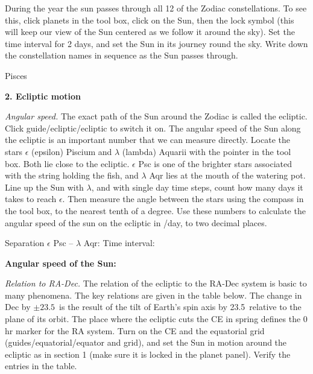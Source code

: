 \documentclass[12pt]{article}
\begin{document}
During the year the sun passes through all 12 of the Zodiac
constellations. To see this, click planets in the tool box, click
on the Sun, then the lock symbol (this will keep our view of the Sun
centered as we follow it around the sky). Set the time interval for 2
days, and set the Sun in its journey round the sky. Write down the
constellation names in sequence as the Sun passes through.

\medskip
Pisces \hrulefill


 \hrulefill

\bigskip
\noindent
{\bf 2. Ecliptic motion}

\medskip
\noindent
\emph{Angular speed.} The exact path of the Sun around the Zodiac is called the ecliptic. Click
guide/ecliptic/ecliptic to switch it on. The angular speed of the Sun
along the ecliptic is an important number that we can measure directly.
Locate the stars $\epsilon$ (epsilon) Piscium and $\lambda$ (lambda)
Aquarii with the pointer in the tool box.  Both lie close to the
ecliptic.  $\epsilon$ Psc is one of the brighter stars associated with
the string holding the fish, and $\lambda$ Aqr lies at the mouth of
the watering pot.  Line up the Sun with $\lambda$, and with single
day time steps, count how many days it takes to reach
$\epsilon$. Then measure the angle between the stars using the compass
in the tool box, to the nearest tenth of a degree.  Use these numbers
to calculate the angular speed of the sun on the ecliptic in \deg/day,
to two decimal places.  

\medskip Separation $\epsilon$ Psc -- $\lambda$
Aqr: \makebox[3cm]{\hrulefill} Time interval: \makebox[3cm]{\hrulefill} 

\medskip 
\centerline{{\bf Angular speed of the Sun:}
\makebox[4cm]{\hrulefill}  }

\bigskip\noindent
\emph{Relation to RA-Dec.} The relation of the ecliptic to the RA-Dec
system is basic to many phenomena. The key relations are given in the
table below. The change in Dec by $\pm 23.5$\deg\ is the
result of the tilt of Earth's spin axis by 23.5\deg\ relative to the
plane of its orbit.  The place where the ecliptic cuts the CE in
spring defines the 0 hr marker for the RA system. Turn on the
CE and the equatorial grid (guides/equatorial/equator and grid), and
set the Sun in motion around the ecliptic as in section 1 (make sure
it is locked in the planet panel). Verify the entries in the table.
\end{document}
